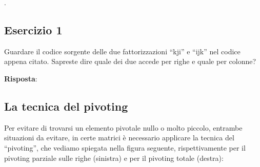 .

\subsection{Esercizio 1}

Guardare il codice sorgente delle due fattorizzazioni ``kji'' e ``ijk'' nel codice appena citato. Sapreste dire quale dei due accede per righe e quale per colonne?

\textbf{Risposta}:

\subsection{La tecnica del pivoting}

Per evitare di trovarsi un elemento pivotale nullo o molto piccolo, entrambe situazioni da evitare, in certe matrici è necessario applicare la tecnica del ``pivoting'', che vediamo spiegata nella figura seguente, rispettivamente per il pivoting parziale sulle righe (sinistra) e per il pivoting totale (destra):

